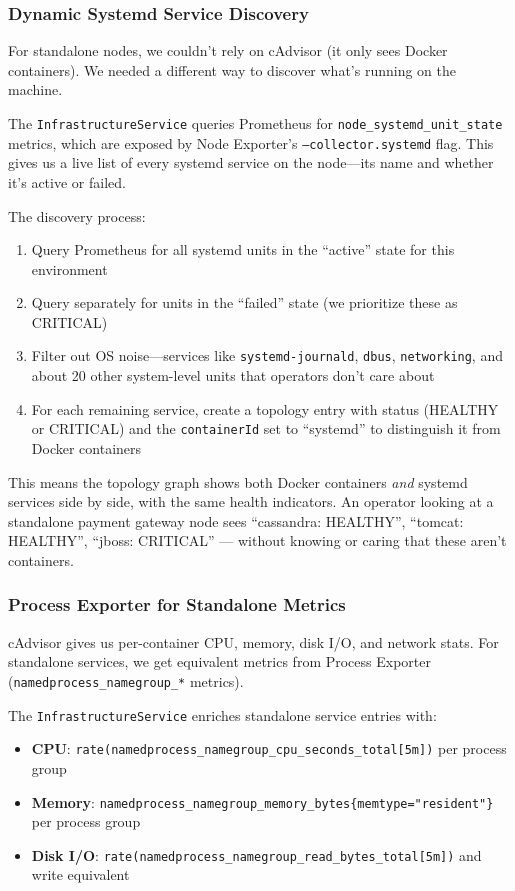 \documentclass[12pt,a4paper]{report}
\begin{document}
\subsubsection{Dynamic Systemd Service Discovery}

For standalone nodes, we couldn't rely on cAdvisor (it only sees Docker containers). We needed a different way to discover what's running on the machine.

The \texttt{InfrastructureService} queries Prometheus for \texttt{node\_systemd\_unit\_state} metrics, which are exposed by Node Exporter's \texttt{--collector.systemd} flag. This gives us a live list of every systemd service on the node---its name and whether it's active or failed.

The discovery process:
\begin{enumerate}
  \item Query Prometheus for all systemd units in the ``active'' state for this environment
  \item Query separately for units in the ``failed'' state (we prioritize these as CRITICAL)
  \item Filter out OS noise---services like \texttt{systemd-journald}, \texttt{dbus}, \texttt{networking}, and about 20 other system-level units that operators don't care about
  \item For each remaining service, create a topology entry with status (HEALTHY or CRITICAL) and the \texttt{containerId} set to ``systemd'' to distinguish it from Docker containers
\end{enumerate}

This means the topology graph shows both Docker containers \textit{and} systemd services side by side, with the same health indicators. An operator looking at a standalone payment gateway node sees ``cassandra: HEALTHY'', ``tomcat: HEALTHY'', ``jboss: CRITICAL'' --- without knowing or caring that these aren't containers.

\subsubsection{Process Exporter for Standalone Metrics}

cAdvisor gives us per-container CPU, memory, disk I/O, and network stats. For standalone services, we get equivalent metrics from Process Exporter (\texttt{namedprocess\_namegroup\_*} metrics).

The \texttt{InfrastructureService} enriches standalone service entries with:
\begin{itemize}
  \item \textbf{CPU}: \texttt{rate(namedprocess\_namegroup\_cpu\_seconds\_total[5m])} per process group
  \item \textbf{Memory}: \texttt{namedprocess\_namegroup\_memory\_bytes\{memtype="resident"\}} per process group
  \item \textbf{Disk I/O}: \texttt{rate(namedprocess\_namegroup\_read\_bytes\_total[5m])} and write equivalent
\end{itemize}
\end{document}
